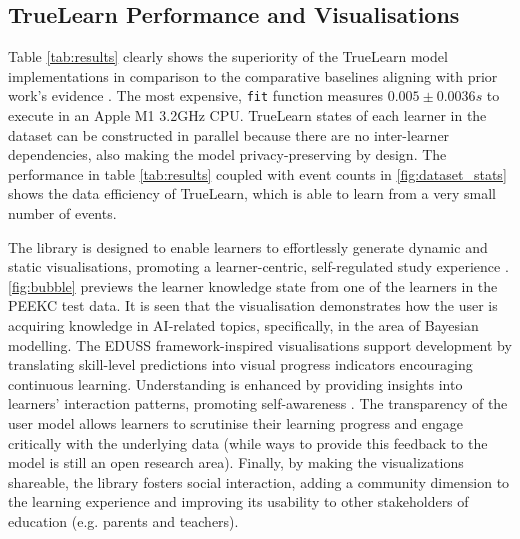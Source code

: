 \documentclass[letterpaper]{article} %
\begin{document}
\subsection{TrueLearn Performance and Visualisations}

Table \ref{tab:results} clearly shows the superiority of the TrueLearn model implementations in comparison to the comparative baselines aligning with prior work's evidence \cite{bulathwela2022sus}. The most expensive, \verb|fit| function measures $0.005\pm0.0036s$ to execute in an Apple M1 3.2GHz CPU. TrueLearn states of each learner in the dataset can be constructed in parallel because there are no inter-learner dependencies, also making the model privacy-preserving by design. The performance in table \ref{tab:results} coupled with event counts in \figurename{ \ref{fig:dataset_stats}} shows the data efficiency of TrueLearn, which is able to learn from a very small number of events.

The library is designed to enable learners to effortlessly generate dynamic and static visualisations, promoting a learner-centric, self-regulated study experience \cite{bull2008metacognition}. \figurename{ \ref{fig:bubble}} previews the learner knowledge state from one of the learners in the PEEKC test data. It is seen that the visualisation demonstrates how the user is acquiring knowledge in AI-related topics, specifically, in the area of Bayesian modelling.
The EDUSS framework-inspired visualisations support development by translating skill-level predictions into visual progress indicators encouraging continuous learning. Understanding is enhanced by providing insights into learners' interaction patterns, promoting self-awareness \cite{mti6060042}. The transparency of the user model allows learners to scrutinise their learning progress and engage critically with the underlying data (while ways to provide this feedback to the model is still an open research area). Finally, by making the visualizations shareable, the library fosters social interaction, adding a community dimension to the learning experience and improving its usability to other stakeholders of education (e.g. parents and teachers).
\end{document}
